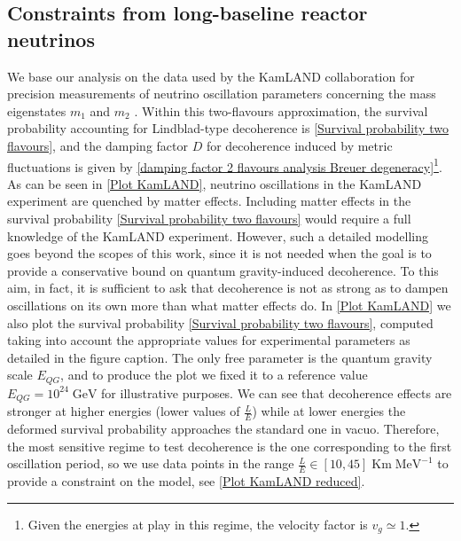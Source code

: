 \documentclass[11pt]{article}
\begin{document}
\subsection{Constraints from long-baseline reactor neutrinos}\label{analysis KAM}

We base our analysis on the data used by the KamLAND collaboration   for precision measurements of neutrino oscillation parameters  concerning the mass eigenstates $m_1$ and $m_2$ \cite{KamLAND:2008dgz}.
Within this two-flavours approximation, the survival probability accounting for Lindblad-type decoherence is \eqref{Survival probability two flavours}, and the damping factor $D$ for decoherence induced by metric fluctuations \cite{Breuer:2008rh} is given by \eqref{damping factor 2 flavours analysis Breuer degeneracy}\footnote{Given the energies at play in this regime, the velocity factor is $v_g\simeq1$.}.
As can be seen in  \cref{Plot KamLAND}, neutrino oscillations in the  KamLAND experiment are quenched by matter effects.
Including matter effects in the survival probability  \eqref{Survival probability two flavours} would require a full knowledge of the  KamLAND experiment. However, such a detailed modelling goes beyond the scopes of this work, since it is not needed when the goal is to provide a conservative bound on quantum gravity-induced decoherence. To this aim, in fact, it is sufficient to ask that decoherence is not as strong as to dampen oscillations on its own more than what matter effects do.
In \cref{Plot KamLAND} we also plot the  survival probability  \eqref{Survival probability two flavours}, computed taking into account the appropriate values for experimental parameters as detailed in the figure caption. The only free parameter is the quantum gravity scale $E_{QG}$, and to produce the plot we fixed it to a reference value $E_{QG} = 10^{24}\;\text{GeV}$ for illustrative purposes. We can  see that decoherence effects are stronger at higher energies (lower values of $\frac{L}{E}$) while at lower energies the deformed survival probability approaches the standard one in vacuo. Therefore, the most sensitive regime to test decoherence is the one corresponding to the first oscillation period, so we use data points in the range $\frac{L}{E}\in [10,45]\;\text{Km}\; \text{MeV}^{-1}$ to provide a constraint on the model, see \cref{Plot KamLAND reduced}.
\end{document}
